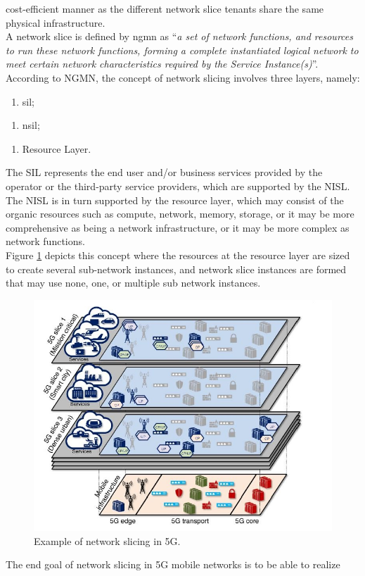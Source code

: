 \documentclass[a4paper,12pt]{report} %
\begin{document}
cost-efficient manner as the different network slice tenants share the same
physical infrastructure.\\
A network slice is defined by \gls{ngmn} as “\textit{a set of network functions, and
resources to run these network functions, forming a complete instantiated
logical network to meet certain network characteristics required by the Service
Instance(s)}”.\\
According to NGMN, the concept of network slicing involves three layers,
namely:
\begin{enumerate}[1]
\item \gls{sil};
\end{enumerate}
\begin{enumerate}[2]
\item \gls{nsil};
\end{enumerate}
\begin{enumerate}[3]
\item Resource Layer.
\end{enumerate}
The SIL represents the end user and/or
business services provided by the operator or the third-party service providers,
which are supported by the NISL. The NISL
is in turn supported by the resource layer, which may consist of the organic
resources such as compute, network, memory, storage, or it may be more
comprehensive as being a network infrastructure, or it may be more complex
as network functions.\\
Figure \ref{layers} depicts this concept where the resources at
the resource layer are sized to create several sub-network instances,
and network slice instances are formed that may use none, one, or multiple sub
network instances.\\
\begin{figure}
\centering
\includegraphics[scale=0.65]{pics/1.JPG}
\caption{Example of network slicing in 5G. \cite{al20185g}}
\label{layers}
\end{figure}The end goal of network slicing in 5G mobile networks is to be able to realize
\end{document}
